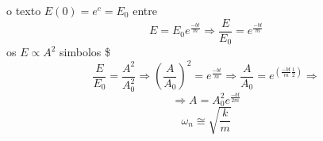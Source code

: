 \documentclass[a4paper,12pt]{article}
\begin{document}
o texto $E(0)=e^c=E_0$ entre
\begin{equation}
E=E_0e^{\frac{-bt}{m}}\Rightarrow \frac{E}{E_0}=e^{\frac{-bt}{m}}
\end{equation}
os $E\propto A^2$ simbolos \$
\begin{equation}
\frac{E}{E_0}=\frac{A^2}{A_0^2}\Rightarrow
\left(\frac{A}{A_0}\right)^2=e^{\frac{-bt}{m}}\Rightarrow \frac{A}{A_0}=e^{(\frac{-bt}{m}\frac{1}{2})}\Rightarrow
\end{equation}
\begin{equation}
\Rightarrow A=A_0^2e^{\frac{-bt}{2m}}
\end{equation}
\begin{equation}
\omega _n\cong \sqrt{\frac{k}{m}}
\end{equation}
\end{document}
